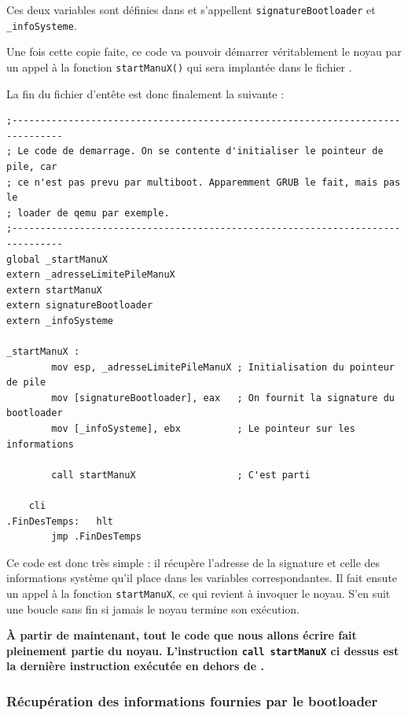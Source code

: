   Ces deux variables sont définies dans
 et s'appellent
\lstinline!signatureBootloader! et \lstinline!_infoSysteme!.
   
   Une fois cette copie faite, ce code va pouvoir démarrer
 véritablement le noyau par un appel à la fonction
\lstinline!startManuX()! qui sera implantée dans le fichier
.

   La fin du fichier d'entête est donc finalement la suivante :

\begin{lstlisting}
;-------------------------------------------------------------------------------
; Le code de demarrage. On se contente d'initialiser le pointeur de pile, car
; ce n'est pas prevu par multiboot. Apparemment GRUB le fait, mais pas le
; loader de qemu par exemple.
;-------------------------------------------------------------------------------
global _startManuX
extern _adresseLimitePileManuX
extern startManuX
extern signatureBootloader
extern _infoSysteme

_startManuX : 
        mov esp, _adresseLimitePileManuX ; Initialisation du pointeur de pile
        mov [signatureBootloader], eax   ; On fournit la signature du bootloader
        mov [_infoSysteme], ebx          ; Le pointeur sur les informations

        call startManuX                  ; C'est parti
 
	cli
.FinDesTemps:	hlt
        jmp .FinDesTemps
\end{lstlisting}

   Ce code est donc très simple : il récupère l'adresse de la
signature et celle des informations système qu'il place dans les
variables correspondantes. Il fait ensute un appel à la fonction
\lstinline!startManuX!, ce qui revient à invoquer le noyau. S'en suit
une boucle sans fin si jamais le noyau termine son exécution.

   {\bf À partir de maintenant, tout le code que nous allons écrire
     fait pleinement partie du noyau. L'instruction \lstinline!call startManuX! ci dessus est la dernière instruction exécutée en
     dehors de \manux.}
   
%
\subsubsection{Récupération des informations fournies par le bootloader}

